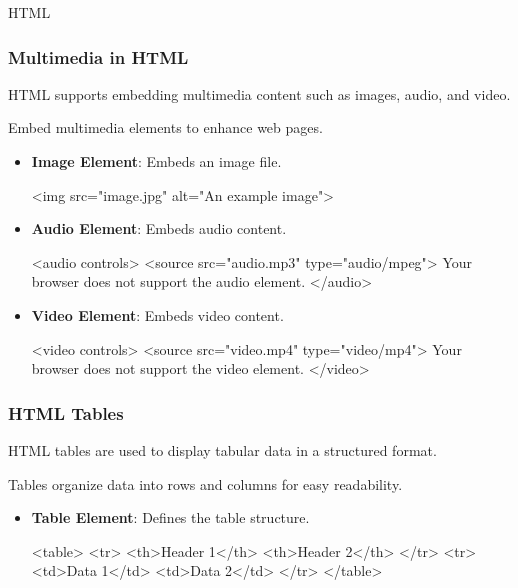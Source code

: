 \begin{notes}{HTML}
\begin{highlight}
    \end{highlight}
    
    \subsubsection*{Multimedia in HTML}
    
    HTML supports embedding multimedia content such as images, audio, and video.
    
    \begin{highlight}
    
        Embed multimedia elements to enhance web pages.
        
        \begin{itemize}
            \item \textbf{Image Element}: Embeds an image file.
    \begin{code}[HTML]
    <img src="image.jpg" alt="An example image">
    \end{code}
            \item \textbf{Audio Element}: Embeds audio content.
    \begin{code}[HTML]
    <audio controls>
        <source src="audio.mp3" type="audio/mpeg">
        Your browser does not support the audio element.
    </audio>
    \end{code}
            \item \textbf{Video Element}: Embeds video content.
    \begin{code}[HTML]
    <video controls>
        <source src="video.mp4" type="video/mp4">
        Your browser does not support the video element.
    </video>
    \end{code}
        \end{itemize}
    
    \end{highlight}
    
    \subsubsection*{HTML Tables}
    
    HTML tables are used to display tabular data in a structured format.
    
    \begin{highlight}
    
        Tables organize data into rows and columns for easy readability.
        
        \begin{itemize}
            \item \textbf{Table Element}: Defines the table structure.
    \begin{code}[HTML]
    <table>
        <tr>
            <th>Header 1</th>
            <th>Header 2</th>
        </tr>
        <tr>
            <td>Data 1</td>
            <td>Data 2</td>
        </tr>
    </table>
    \end{code}
        \end{itemize}
    

\end{highlight}
\end{notes}
